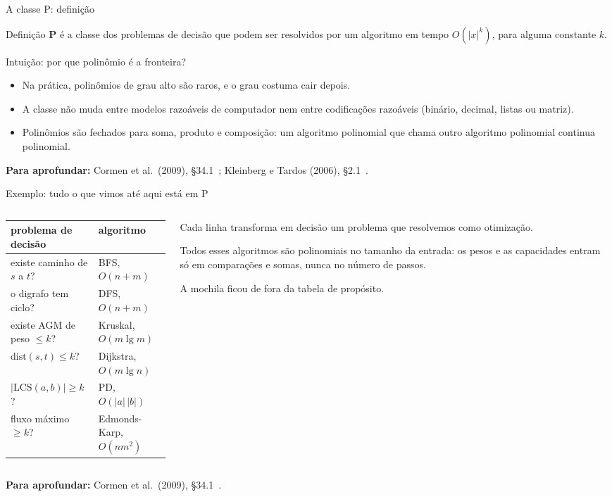 \documentclass[aspectratio=169,xcolor=table]{beamer}
\newcommand{\fonte}[1]{%
  \vfill
  {\tiny\color{gray!55!black}\textbf{Para aprofundar:} #1\par}%
}
\begin{document}
\begin{frame}{A classe P: definição}
  \begin{block}{Definição}
    \small
    \textbf{P} é a classe dos problemas de decisão que podem ser resolvidos por um algoritmo
    em tempo $O(|x|^k)$, para alguma constante $k$.
  \end{block}
  \begin{exampleblock}{Intuição: por que polinômio é a fronteira?}
    \scriptsize
    \begin{itemize}
      \item Na prática, polinômios de grau alto são raros, e o grau costuma cair depois.
      \item A classe não muda entre modelos razoáveis de computador nem entre codificações
            razoáveis (binário, decimal, listas ou matriz).
      \item Polinômios são fechados para soma, produto e composição: um algoritmo polinomial
            que chama outro algoritmo polinomial continua polinomial.
    \end{itemize}
  \end{exampleblock}
  \fonte{Cormen et al.\ (2009), \S 34.1~\cite{cormen2009introduction};
    Kleinberg e Tardos (2006), \S 2.1~\cite{kleinberg2006algorithm}.}
\end{frame}

\begin{frame}{Exemplo: tudo o que vimos até aqui está em P}
  \begin{columns}[c]
    \begin{column}{0.55\textwidth}
      \scriptsize
      \centering
      \begin{tabular}{ll}
        \toprule
        problema de decisão & algoritmo \\
        \midrule
        existe caminho de $s$ a $t$? & BFS, $O(n + m)$ \\
        o digrafo tem ciclo? & DFS, $O(n + m)$ \\
        existe AGM de peso $\le k$? & Kruskal, $O(m \lg m)$ \\
        $\mathrm{dist}(s,t) \le k$? & Dijkstra, $O(m \lg n)$ \\
        $|\mathrm{LCS}(a, b)| \ge k$? & PD, $O(|a|\,|b|)$ \\
        fluxo máximo $\ge k$? & Edmonds-Karp, $O(nm^2)$ \\
        \bottomrule
      \end{tabular}
    \end{column}
    \begin{column}{0.41\textwidth}
      \scriptsize
      Cada linha transforma em decisão um problema que resolvemos como otimização.
      \medskip

      Todos esses algoritmos são polinomiais no tamanho da entrada: os pesos e as capacidades
      entram só em comparações e somas, nunca no número de passos.
      \medskip

      A mochila ficou de fora da tabela de propósito.
    \end{column}
  \end{columns}
  \fonte{Cormen et al.\ (2009), \S 34.1~\cite{cormen2009introduction}.}
\end{frame}
\end{document}
